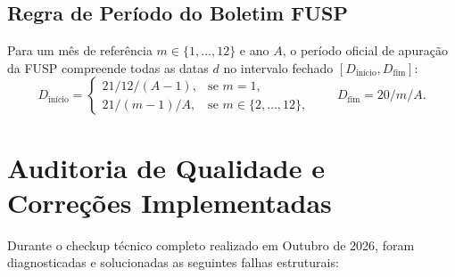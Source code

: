 \documentclass[11pt,a4paper]{article}
\begin{document}
\subsection{Regra de Período do Boletim FUSP}
Para um mês de referência $m \in \{1, \dots, 12\}$ e ano $A$, o período oficial de apuração da FUSP compreende todas as datas $d$ no intervalo fechado $[D_{\text{início}}, D_{\text{fim}}]$:
\[
D_{\text{início}} = 
\begin{cases}
21/12/(A-1), & \text{se } m = 1, \\
21/(m-1)/A, & \text{se } m \in \{2, \dots, 12\},
\end{cases}
\qquad
D_{\text{fim}} = 20/m/A.
\]

\section{Auditoria de Qualidade e Correções Implementadas}

Durante o checkup técnico completo realizado em Outubro de 2026, foram diagnosticadas e solucionadas as seguintes falhas estruturais:
\end{document}
